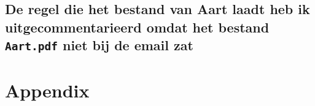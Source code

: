 \documentclass{2wa40summary}
\begin{document}
\subsection{{\color{blue}De regel die het bestand van Aart laadt heb ik uitgecommentarieerd omdat het bestand \texttt{Aart.pdf} niet bij de email zat}}

%		
		
\appendix
\section{Appendix}

\newpage

\newpage
{}
\begin{scriptsize}\printindex\end{scriptsize}
\end{document}
